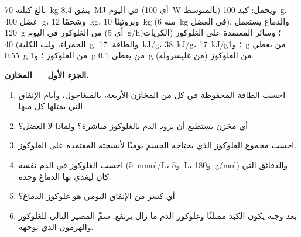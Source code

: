 \begin{problem}
\label{pb:b1:biosyntheses-integration:1}
بالغ كتلته \qty{70}{kg} ينفق \qty{8.4}{MJ} في اليوم (أي \qty{100}{W}
بالمتوسط) ويحمل:  كبد \qty{100}{g}،  عضل
\qty{400}{g}، وشحمًا \qty{12}{kg}، وبروتينًا \qty{10}{kg} (منه
\qty{6}{kg} في العضل). والدماغ يستعمل \qty{120}{g} من الغلوكوز في
اليوم (أي \qty{5}{g/h})؛ وسائر  المعتمدة على الغلوكوز
(الكريات الحمراء، ولب الكلية) \qty{40}{g}. والطاقة: 
\qty{17}{kJ/g}،  \qty{38}{kJ/g}،  \qty{17}{kJ/g}؛
و\qty{1}{g} من  يعطي \qty{0.55}{g} من الغلوكوز ؛ و\qty{1}{g} من  يعطي \qty{0.1}{g} من الغلوكوز (من
غليسروله).

\medskip
\noindent\textbf{الجزء الأول --- المخازن.}
\begin{enumerate}
  \item احسب الطاقة المحفوظة في كل من المخازن الأربعة، بالميغاجول،
        وأيام الإنفاق التي يمثلها كل منها.
  \item أي مخزن يستطيع أن يزود الدم بالغلوكوز مباشرة؟ ولماذا لا
         العضل؟
  \item احسب مجموع الغلوكوز الذي يحتاجه الجسم يوميًا لأنسجته المعتمدة
        على الغلوكوز.
  \item احسب الغلوكوز في الدم نفسه (\qty{5}{mmol/L}، و\qty{5}{L}،
        و\qty{180}{g/mol}) والدقائق التي كان ليغذي بها الدماغ وحده.
  \item أي كسر من الإنفاق اليومي هو غلوكوز الدماغ؟
  \item بعد وجبة يكون  الكبد ممتلئًا وغلوكوز الدم ما زال
        يرتفع. سمِّ المصير التالي للغلوكوز والهرمون الذي يوجهه.
\end{enumerate}


\end{problem}
